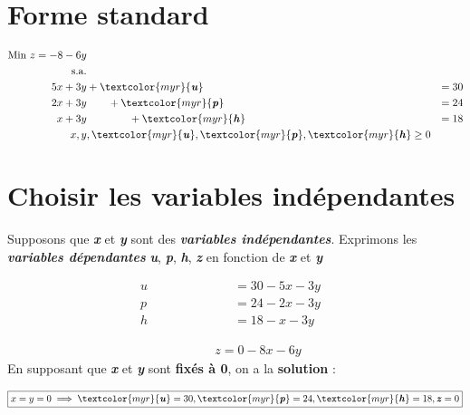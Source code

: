 \documentclass{report}
\newcommand{\Pointilles}[1]{%
  \par\nobreak
  \noindent\rule{0pt}{1.5\baselineskip}%
  \multido{}{#1}{\noindent\makebox[\linewidth]{\dotfill}\endgraf}%
  \bigskip%
}
\begin{document}
\begin{multicols*}{3}
\section{Forme standard}

\begin{align*}
    \text{Min } z = -8 -6y \\ 
    \text{s.a.} 
    \\
    5x + 3y& + \textcolor{myr}{\textbf{\textit{u}}}   &= 30 \\
    2x + 3y& \quad\quad + \textcolor{myr}{\textbf{\textit{p}}}   &= 24\\
     x + 3y& \quad\quad\quad\quad + \textcolor{myr}{\textbf{\textit{h}}}   &= 18 \\
     x, y&,  
     \textcolor{myr}{\textbf{\textit{u}}}, 
     \textcolor{myr}{\textbf{\textit{p}}},
     \textcolor{myr}{\textbf{\textit{h}}} \geq 0
\end{align*}

\section{Choisir les variables indépendantes}
Supposons que 
\textcolor{myb}{\textbf{\textit{x}}} et 
\textcolor{myb}{\textbf{\textit{y}}} sont des 
\textcolor{myb}{\textbf{\textit{variables indépendantes}}}. Exprimons 
les \textcolor{myr}{\textbf{\textit{variables dépendantes}}} 
\textcolor{myr}{\textbf{\textit{u}}},
\textcolor{myr}{\textbf{\textit{p}}},
\textcolor{myr}{\textbf{\textit{h}}},
\textcolor{myr}{\textbf{\textit{z}}} en fonction de 
\textcolor{myb}{\textbf{\textit{x}}} et \textcolor{myb}{\textbf{\textit{y}}}


\begin{align*}
    u \quad\quad\quad\quad\quad\quad &= 30 - 5x -3y& \\
    p \quad\quad\quad\quad  &= 24 -2x -3y& \\
    h \quad\quad &= 18 - x -3y&
\end{align*}
\vspace{-2.5em}    
\Pointilles{1}
\vspace{-2.5em}
\begin{align*}
    \quad\quad\quad\;\; z = 0 -8x -6y
\end{align*}
En supposant que 
\textcolor{myb}{\textbf{\textit{x}}} et 
\textcolor{myb}{\textbf{\textit{y}}}  sont \textbf{fixés à 0}, 
on a la \textbf{solution} : 

\begin{align*}
\boxed{x = y = 0 \implies 
\textcolor{myr}{\textbf{\textit{u}}}  = 30, 
\textcolor{myr}{\textbf{\textit{p}}} = 24,
\textcolor{myr}{\textbf{\textit{h}}} = 18,
\textbf{\textit{z}} = 0}
\end{align*}


\end{multicols*}
\end{document}
